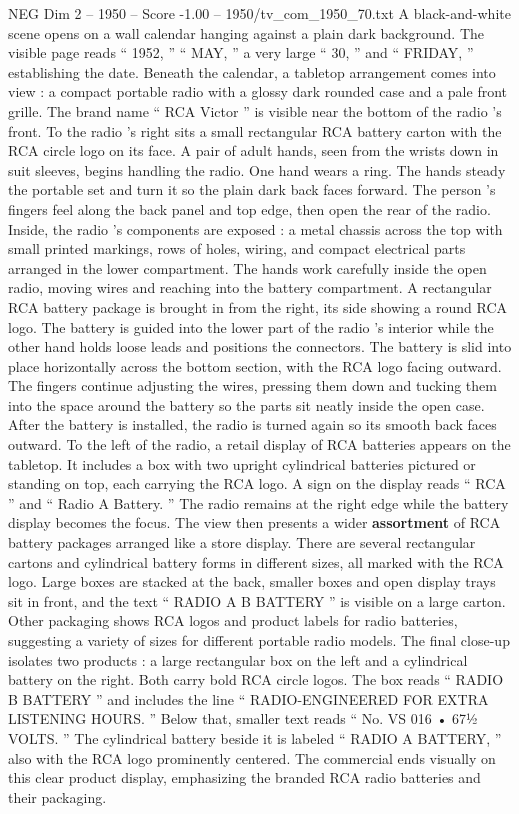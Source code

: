 \begin{textsample}{NEG Dim 2 – 1950 – Score -1.00 – 1950/tv\_com\_1950\_70.txt}  \label{ex:f2_neg_002}
A black-and-white scene opens on a wall calendar hanging against a plain dark background.
The visible page reads “ 1952, ” “ MAY, ” a very large “ 30, ” and “ FRIDAY, ” establishing the date.
Beneath the calendar, a tabletop arrangement comes into view : a compact portable radio with a glossy dark rounded case and a pale front grille.
The brand name “ RCA Victor ” is visible near the bottom of the radio ’s front.
To the radio ’s right sits a small rectangular RCA battery carton with the RCA circle logo on its face.
A pair of adult hands, seen from the wrists down in suit sleeves, begins handling the radio.
One hand wears a ring.
The hands steady the portable set and turn it so the plain dark back faces forward.
The person ’s fingers feel along the back panel and top edge, then open the rear of the radio.
Inside, the radio ’s components are exposed : a metal chassis across the top with small printed markings, rows of holes, wiring, and compact electrical parts arranged in the lower compartment.
The hands work carefully inside the open radio, moving wires and reaching into the battery compartment.
A rectangular RCA battery package is brought in from the right, its side showing a round RCA logo.
The battery is guided into the lower part of the radio ’s interior while the other hand holds loose leads and positions the connectors.
The battery is slid into place horizontally across the bottom section, with the RCA logo facing outward.
The fingers continue adjusting the wires, pressing them down and tucking them into the space around the battery so the parts sit neatly inside the open case.
After the battery is installed, the radio is turned again so its smooth back faces outward.
To the left of the radio, a retail display of RCA batteries appears on the tabletop.
It includes a box with two upright cylindrical batteries pictured or standing on top, each carrying the RCA logo.
A sign on the display reads “ RCA ” and “ Radio A Battery. ” The radio remains at the right edge while the battery display becomes the focus.
The view then presents a wider \textbf{assortment} of RCA battery packages arranged like a store display.
There are several rectangular cartons and cylindrical battery forms in different sizes, all marked with the RCA logo.
Large boxes are stacked at the back, smaller boxes and open display trays sit in front, and the text “ RADIO A B BATTERY ” is visible on a large carton.
Other packaging shows RCA logos and product labels for radio batteries, suggesting a variety of sizes for different portable radio models.
The final close-up isolates two products : a large rectangular box on the left and a cylindrical battery on the right.
Both carry bold RCA circle logos.
The box reads “ RADIO B BATTERY ” and includes the line “ RADIO-ENGINEERED FOR EXTRA LISTENING HOURS. ” Below that, smaller text reads “ No.
VS 016 • 67½ VOLTS. ” The cylindrical battery beside it is labeled “ RADIO A BATTERY, ” also with the RCA logo prominently centered.
The commercial ends visually on this clear product display, emphasizing the branded RCA radio batteries and their packaging.

\end{textsample}
